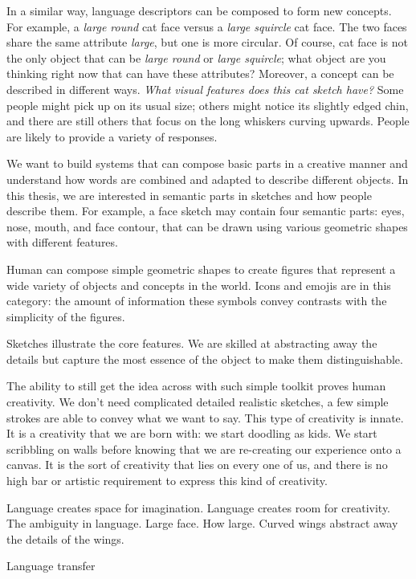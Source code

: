 In a similar way, language descriptors can be composed to form new concepts. For example, a \textit{large round} cat face versus a \textit{large squircle} cat face. The two faces share the same attribute \textit{large}, but one is more circular. Of course, cat face is not the only object that can be \textit{large round} or \textit{large squircle}; what object are you thinking right now that can have these attributes?
Moreover, a concept can be described in different ways. \textit{What visual features does this cat sketch have?} Some people might pick up on its usual size; others might notice its slightly edged chin, and there are still others that focus on the long whiskers curving upwards. People are likely to provide a variety of responses.  

We want to build systems that can compose basic parts in a creative manner and understand how words are combined and adapted to describe different objects.  
In this thesis, we are interested in semantic parts in sketches and how people describe them. For example, a face sketch may contain four semantic parts: eyes, nose, mouth, and face contour, that can be drawn using various geometric shapes with different features.    

Human can compose simple geometric shapes to create figures that represent a wide variety of objects and concepts in the world. Icons and emojis are in this category: the amount of information these symbols convey contrasts with the simplicity of the figures. 

Sketches illustrate the core features. We are skilled at abstracting away the details but capture the most essence of the object to make them distinguishable.

The ability to still get the idea across with such simple toolkit proves human creativity. We don't need complicated detailed realistic sketches, a few simple strokes are able to convey what we want to say. This type of creativity is innate. It is a creativity that we are born with: we start doodling as kids. We start scribbling on walls before knowing that we are re-creating our experience onto a canvas. It is the sort of creativity that lies on every one of us, and there is no high bar or artistic requirement to express this kind of creativity.

Language creates space for imagination. Language creates room for creativity. The ambiguity in language. Large face. How large. Curved wings abstract away the details of the wings.

Language transfer